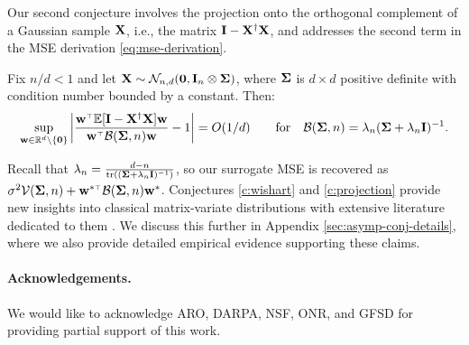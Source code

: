 \documentclass[11pt]{article}
\begin{document}
\noindent
Our second conjecture involves the projection onto the
orthogonal complement of a Gaussian sample $\mathbf X$, i.e., the matrix
$\mathbf I-\mathbf X^\dagger\mathbf X$, and addresses
the second term in the MSE derivation \eqref{eq:mse-derivation}.
\begin{conjecture}\label{c:projection}
  Fix $n/d<1$ and let $\mathbf X\sim \mathcal{N}_{n,d}(\mathbf 0,\mathbf I_n \otimes \mathbf{\Sigma})$, where
$\mathbf{\Sigma}$ is $d\times d$ positive definite with condition number
bounded by a constant. Then:
\begin{align}
\sup_{\w\in\R^d\backslash\{\zero\}}\bigg|\frac{\w^\top\E[\I-\X^\dagger\X]\w}{\w^\top
  \Bc(\Sigmab,n)\w} - 1\bigg| = O(1/d)\qquad\text{for}\quad
  \Bc(\Sigmab,n) =
  \lambda_n(\Sigmab+\lambda_n\I)^{-1}.\label{eq:projection}
\end{align}
\end{conjecture}

\noindent
Recall that $\lambda_n=\frac {d-n}{\mathrm{tr}((\mathbf{\Sigma}+\lambda_n\mathbf I)^{-1})}$,
so our surrogate MSE is recovered as
$\sigma^2\Vc(\Sigmab,n)+\w^{*\top}\Bc(\Sigmab,n)\w^*$. 
Conjectures \ref{c:wishart} and \ref{c:projection} provide new insights into classical matrix-variate
distributions with extensive literature dedicated to them \citep[see,
e.g.,][]{chikuse1990matrix,cook2011}. We discuss 
this further in Appendix \ref{sec:asymp-conj-details},
where we also provide detailed empirical evidence supporting these claims.







\paragraph{Acknowledgements.}
We would like to acknowledge ARO, DARPA, NSF, ONR, and GFSD for providing
partial support of this work.

\ifisarxiv\fi


\appendix


\end{document}
